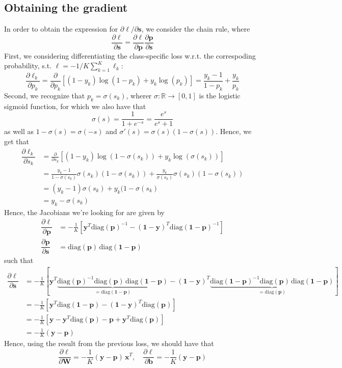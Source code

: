 \documentclass{article}
\begin{document}
\subsection*{Obtaining the gradient}
	In order to obtain the expression for $\partial\ell/\partial\bm{s}$, we consider the chain rule, where
	$$\dfrac{\partial\ell}{\partial\bm{s}} = \dfrac{\partial\ell}{\partial\bm{p}}\dfrac{\partial\bm{p}}{\partial\bm{s}}$$
	First, we considering differentiating the class-specific loss w.r.t. the correspoding probability, s.t. $\ell = -1/K \sum_{k=1}^K \ell_k$:
		$$\dfrac{\partial\ell_k}{\partial p_k} = \frac{\partial}{\partial p_k} \left[ (1 - y_k)\log(1 - p_k) + y_k \log(p_k)\right] = \frac{y_k - 1}{1 - p_k} + \frac{y_k}{p_k} $$
	Second, we recognize that $p_k = \sigma(s_k)$, wherer $\sigma: \mathbb{R} \rightarrow [0, 1]$ is the logistic sigmoid function, for which we also have that
	$$\sigma(s) = \frac{1}{1 + e^{-s}} = \frac{e^{s}}{e^{s} + 1}$$
	as well as $1 - \sigma(s) = \sigma(-s)$ and $\sigma'(s) = \sigma(s)(1 - \sigma(s))$. Hence, we get that
	\begin{align*}
		\dfrac{\partial \ell_k}{\partial s_k} &=  \frac{\partial}{\partial s_k} \left[ (1 - y_k)\log(1 - \sigma(s_k)) + y_k \log(\sigma(s_k))\right] \\
		&=\frac{y_k - 1}{1 - \sigma(s_k)}\sigma(s_k)(1 - \sigma(s_k)) + \frac{y_k}{\sigma(s_k)}\sigma(s_k)(1 - \sigma(s_k)) \\
		&=  (y_k - 1)\sigma(s_k) + y_k(1 - \sigma(s_k) \\
		&=  y_k - \sigma(s_k)  
	\end{align*}
	Hence, the Jacobians we're looking for are given by
	\begin{align*}
		\dfrac{\partial\ell}{\partial \bm{p}} &= -\frac{1}{K}\left[\bm{y}^T\text{diag}(\bm{p})^{-1} - (\bm{1} - \bm{y})^T \text{diag}(\bm{1} - \bm{p})^{-1}\right]\\
		\dfrac{\partial\bm{p}}{\partial \bm{s}} &= \text{diag}(\bm{p})\,\text{diag}(\bm{1} - \bm{p})
	\end{align*}
	such that
	\begin{align*}
		\dfrac{\partial\ell}{\partial \bm{s}} &= -\frac{1}{K}\left[\bm{y}^T\underbrace{\text{diag}(\bm{p})^{-1}\text{diag}(\bm{p})\,\text{diag}(\bm{1} - \bm{p})}_{=\text{diag}(\bm{1} - \bm{p})} -  (\bm{1} - \bm{y})^T \underbrace{\text{diag}(\bm{1} - \bm{p})^{-1}\text{diag}(\bm{p})\,\text{diag}(\bm{1} - \bm{p})}_{=\text{diag}(\bm{p})}  \right]\\
		&= -\frac{1}{K}\left[ \bm{y}^T\text{diag}(\bm{1} - \bm{p}) - (\bm{1} - \bm{y})^T\text{diag}(\bm{p})\right] \\
		&= -\frac{1}{K}\left[\bm{y} - \bm{y}^T\text{diag}(\bm{p}) - \bm{p} + \bm{y}^T\text{diag}(\bm{p}) \right] \\
		&= -\frac{1}{K}(\bm{y} - \bm{p})
	\end{align*}
	Hence, using the result from the previous loss, we should have that
	$$\dfrac{\partial\ell}{\partial \bm{W}} = -\frac{1}{K}(\bm{y} - \bm{p})\,\bm{x}^T, \quad \dfrac{\partial\ell}{\partial \bm{b}} = -\frac{1}{K}(\bm{y} - \bm{p})$$
\end{document}
